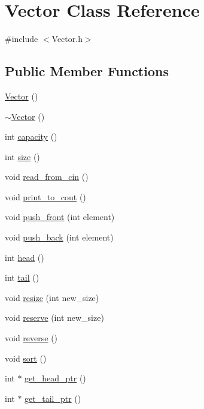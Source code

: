 \hypertarget{classVector}{\section{\-Vector \-Class \-Reference}
\label{classVector}
}


{\ttfamily \#include $<$\-Vector.\-h$>$}

\subsection*{\-Public \-Member \-Functions}
\begin{DoxyCompactItemize}
\item 
\hyperlink{classVector_a6f80c73b5f18dcf3f8e36065bdc8b9e5}{\-Vector} ()
\item 
\hyperlink{classVector_a2eb3c49587a4f12cade7895ccb73f6a0}{$\sim$\-Vector} ()
\item 
int \hyperlink{classVector_abb744ce970cfd0584ad1d99a2d33a047}{capacity} ()
\item 
int \hyperlink{classVector_a93f0b87707399eaa672d93e54c033f7a}{size} ()
\item 
void \hyperlink{classVector_aaea16ef0bcb43c7aeee6395987905aa8}{read\-\_\-from\-\_\-cin} ()
\item 
void \hyperlink{classVector_ac5b7bdeac6d607991685556a6e3f88fe}{print\-\_\-to\-\_\-cout} ()
\item 
void \hyperlink{classVector_a8f2f1be5ed75ac3f3236a1e1fa05fbc5}{push\-\_\-front} (int element)
\item 
void \hyperlink{classVector_acf749a651b6f16f2b31283fd5e74eb4a}{push\-\_\-back} (int element)
\item 
int \hyperlink{classVector_aefb2e4fad67ff1848dc789dd08f07391}{head} ()
\item 
int \hyperlink{classVector_a8567d209f161be0e571290bd1b86251d}{tail} ()
\item 
void \hyperlink{classVector_a1b9bc6f24966653b74efeffa51622099}{resize} (int new\-\_\-size)
\item 
void \hyperlink{classVector_aa33beca7660914e5d122beea73dab22e}{reserve} (int new\-\_\-size)
\item 
void \hyperlink{classVector_a7499ea12bcfe66505a91c738355757d9}{reverse} ()
\item 
void \hyperlink{classVector_a7bd21e36dd4bff610338e4ce996d0cec}{sort} ()
\item 
int $\ast$ \hyperlink{classVector_a4376506b366509c0eb5e9502807bac18}{get\-\_\-head\-\_\-ptr} ()
\item 
int $\ast$ \hyperlink{classVector_a66988dd8f920ba54b182793458b6f69f}{get\-\_\-tail\-\_\-ptr} ()
\end{DoxyCompactItemize}
